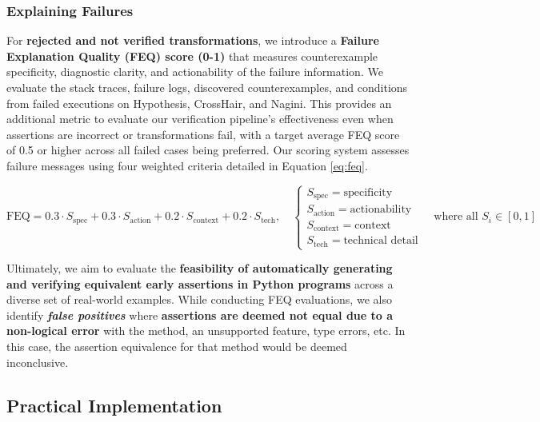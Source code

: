 \documentclass[8pt]{extarticle}
\begin{document}
\subsubsection{Explaining Failures}
For \textbf{rejected and not verified transformations}, we introduce a \textbf{Failure Explanation Quality (FEQ) score (0-1)} that measures counterexample specificity, diagnostic clarity, and actionability of the failure information. We evaluate the stack traces, failure logs, discovered counterexamples, and conditions from failed executions on Hypothesis, CrossHair, and Nagini. This provides an additional metric to evaluate our verification pipeline's effectiveness even when assertions are incorrect or transformations fail, with a target average FEQ score of 0.5 or higher across all failed cases being preferred. Our scoring system assesses failure messages using four weighted criteria detailed in Equation \ref{eq:feq}.

\begin{equation}
\label{eq:feq}
\text{FEQ} = 0.3 \cdot S_{\text{spec}} + 0.3 \cdot S_{\text{action}} + 0.2 \cdot S_{\text{context}} + 0.2 \cdot S_{\text{tech}}, \quad
\begin{cases}
S_{\text{spec}} = \text{specificity} \\
S_{\text{action}} = \text{actionability} \\
S_{\text{context}} = \text{context} \\
S_{\text{tech}} = \text{technical detail}
\end{cases}
\quad \text{where all } S_i \in [0,1]
\end{equation}

Ultimately, we aim to evaluate the \textbf{feasibility of automatically generating and verifying equivalent early assertions in Python programs} across a diverse set of real-world examples. While conducting FEQ evaluations, we also identify \textbf{\textit{false positives}} where \textbf{assertions are deemed not equal due to a non-logical error} with the method, an unsupported feature, type errors, etc. In this case, the assertion equivalence for that method would be deemed inconclusive. 

\subsection{Practical Implementation} 
\end{document}
